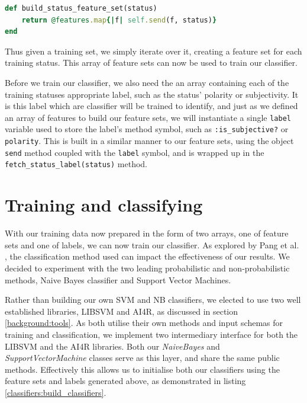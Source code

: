 \begin{lstlisting}[language=Ruby, caption={Method for building a status's feature set, where \texttt{@features = [:feature\_1,..., :feature\_n]}}, label=classifiers:status_feature_set]
def build_status_feature_set(status)
	return @features.map{|f| self.send(f, status)}
end
\end{lstlisting}

Thus given a training set, we simply iterate over it, creating a feature set for each training status. This array of feature sets can now be used to train our classifier.

Before we train our classifier, we also need the an array containing each of the training statuses appropriate label, such as the status' polarity or subjectivity. It is this label which are classifier will be trained to identify, and just as we defined an array of features to build our feature sets, we will instantiate a single \texttt{label} variable used to store the label's method symbol, such as \texttt{:is\_subjective?} or \texttt{polarity}. This is built in a similar manner to our feature sets, using the object \texttt{send} method coupled with the \texttt{label} symbol, and is wrapped up in the \texttt{fetch\_status\_label(status)} method.

\section{Training and classifying}

With our training data now prepared in the form of two arrays, one of feature sets and one of labels, we can now train our classifier. As explored by Pang et al. \cite{Pang:2008wj}, the classification method used can impact the effectiveness of our results. We decided to experiment with the two leading probabilistic and non-probabilistic methods, Naive Bayes classifier and Support Vector Machines. 

Rather than building our own SVM and NB classifiers, we elected to use two well established libraries, LIBSVM and AI4R, as discussed in section \ref{background:tools}. As both utilise their own methods and input schemas for training and classification, we implement two intermediary interface for both the LIBSVM and the AI4R libraries. Both our \emph{NaiveBayes} and \emph{SupportVectorMachine} classes serve as this layer, and share the same public methods. Effectively this allows us to initialise both our classifiers using the feature sets and labels generated above, as demonstrated in listing \ref{classifiers:build_classifiers}. 

